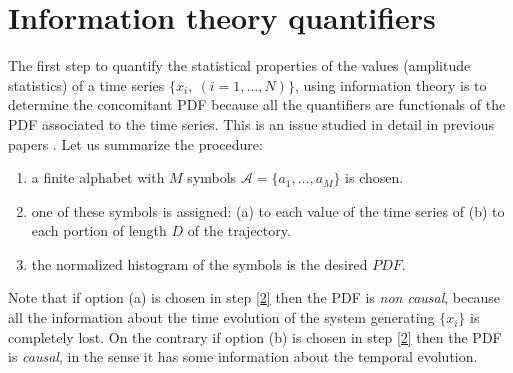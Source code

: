 \section{Information theory quantifiers}\label{sec:quant}

The first step to quantify the statistical properties of the values (amplitude statistics) of a time series $\{x_i,~(i=1,...,N)\}$, using information theory is to determine the concomitant PDF because all the quantifiers are functionals of the PDF associated to the time series. This is an issue studied in detail in previous papers \cite{aka varios}. Let us summarize the procedure:

\begin{enumerate} 
\item \label{1} a finite alphabet with $M$ symbols $\mathcal{A}=\{a_1,...,a_M\}$ is chosen. 
\item \label{2} one of these symbols is assigned: (a) to each value of the time series of (b) to each portion of length $D$ of the trajectory. 
\item \label{3} the normalized histogram of the symbols is the desired $PDF$.
\end{enumerate}

Note that if option (a) is chosen in step \ref{2} then the PDF is \textit{non causal}, because all the information about the time evolution of the system generating $\{x_i\}$ is completely lost. On the contrary if option (b) is chosen in step \ref{2} then the PDF is \textit{causal}, in the sense it has some information about the temporal evolution.


